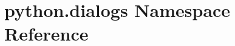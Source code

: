 \hypertarget{namespacepython_1_1dialogs}{\section{python.\-dialogs Namespace Reference}
\label{namespacepython_1_1dialogs}
}
